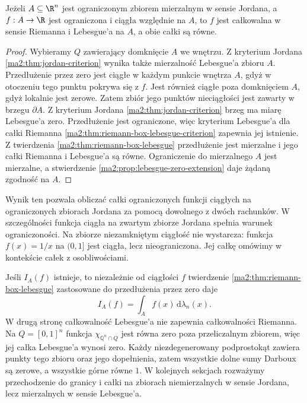 \begin{twierdzenie}
\label{ma2:thm:lebesgue-jordan-agreement}
Jeżeli $A\subseteq\R^n$ jest ograniczonym
zbiorem mierzalnym w sensie Jordana,
a $f:A\to\R$ jest ograniczona i ciągła
względnie na $A$, to $f$ jest całkowalna
w sensie Riemanna i Lebesgue'a na $A$,
a obie całki są równe.
\end{twierdzenie}
\begin{proof}
Wybieramy $Q$ zawierający domknięcie $A$
we wnętrzu. Z kryterium Jordana
\ref{ma2:thm:jordan-criterion} wynika także
mierzalność Lebesgue'a zbioru $A$. Przedłużenie przez zero
jest ciągłe w każdym punkcie wnętrza $A$,
gdyż w otoczeniu tego punktu pokrywa się
z $f$. Jest również ciągłe poza domknięciem
$A$, gdyż lokalnie jest zerowe.
Zatem zbiór jego punktów nieciągłości
jest zawarty w brzegu $\partial A$.
Z kryterium Jordana
\ref{ma2:thm:jordan-criterion}
brzeg ma miarę Lebesgue'a zero.
Przedłużenie jest ograniczone, więc
kryterium Lebesgue'a dla całki Riemanna
\ref{ma2:thm:riemann-box-lebesgue-criterion}
zapewnia jej istnienie. Z twierdzenia
\ref{ma2:thm:riemann-box-lebesgue}
przedłużenie jest mierzalne i jego całki
Riemanna i Lebesgue'a są równe.
Ograniczenie do mierzalnego $A$ jest
mierzalne, a stwierdzenie
\ref{ma2:prop:lebesgue-zero-extension}
daje żądaną zgodność na $A$.
\end{proof}

Wynik ten pozwala obliczać całki
ograniczonych funkcji ciągłych na ograniczonych
zbiorach Jordana za pomocą dowolnego
z dwóch rachunków. W szczególności funkcja
ciągła na zwartym zbiorze Jordana spełnia
warunek ograniczoności. Na zbiorze niezamkniętym
ciągłość nie wystarcza: funkcja $f(x)=1/x$
na $(0,1]$ jest ciągła, lecz nieograniczona.
Jej całkę omówimy w kontekście całek z osobliwościami.

Jeśli $I_A(f)$ istnieje, to niezależnie od
ciągłości $f$ twierdzenie
\ref{ma2:thm:riemann-box-lebesgue} zastosowane
do przedłużenia przez zero daje
\[
 I_A(f)=\int_A f(x)\,\mathrm d\lambda_n(x).
\]
W drugą stronę całkowalność Lebesgue'a
nie zapewnia całkowalności Riemanna.
Na $Q=[0,1]^n$ funkcja
$\chi_{\mathbb Q^n\cap Q}$ jest równa zero
poza przeliczalnym zbiorem, więc jej całka
Lebesgue'a wynosi zero. Każdy niezdegenerowany
podprostokąt zawiera punkty tego zbioru
oraz jego dopełnienia, zatem wszystkie
dolne sumy Darboux są zerowe, a wszystkie
górne równe $1$. W kolejnych
sekcjach rozważymy przechodzenie
do granicy i całki na zbiorach
niemierzalnych w sensie Jordana,
lecz mierzalnych w sensie Lebesgue'a.


